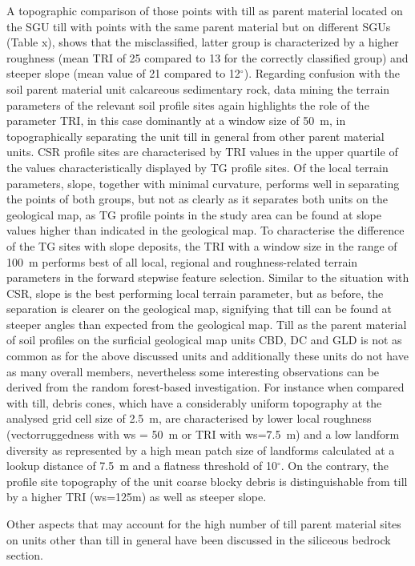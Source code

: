 \documentclass[preprint,12pt,authoryear]{elsarticle}
\begin{document}
 A topographic comparison of those points with till as parent material located on the SGU till with points with the same parent material but on different SGUs (Table x), shows that the misclassified, latter group is characterized by a higher roughness (mean TRI of 25 compared to 13 for the correctly classified group) and steeper slope (mean value of 21 compared to 12$^{\circ}$). Regarding confusion with the soil parent material unit calcareous sedimentary rock, data mining the terrain parameters of the relevant soil profile sites again highlights the role of the parameter TRI, in this case dominantly at a window size of 50~m, in topographically separating the unit till in general from other parent material units. CSR profile sites are characterised by TRI values in the upper quartile of the values characteristically displayed by TG profile sites. Of the local terrain parameters, slope, together with minimal curvature, performs well in separating the points of both groups, but not as clearly as it separates both units on the geological map, as TG profile points in the study area can be found at slope values higher than indicated in the geological map. To characterise the difference of the TG sites with slope deposits, the TRI with a window size in the range of 100~m performs best of all local, regional and roughness-related terrain parameters in the forward stepwise feature selection. Similar to the situation with CSR, slope is the best performing local terrain parameter, but as before, the separation is clearer on the geological map, signifying that till can be found at steeper angles than   expected from the geological map. Till as the parent material of soil profiles on the surficial geological map units CBD, DC and GLD is not as common as for the above discussed units and additionally these units do not have as many overall members, nevertheless some interesting observations can be derived from the random forest-based investigation. For instance when compared with till, debris cones, which have a considerably uniform topography at the analysed grid cell size of 2.5~m, are characterised by lower local roughness (vectorruggedness with ws = 50~m or TRI with ws=7.5~m) and a low landform diversity as represented by a high mean patch size of landforms calculated at a lookup distance of 7.5~m and a flatness threshold of 10$^{\circ}$. On the contrary, the profile site topography of the unit coarse blocky debris is distinguishable from till by a higher TRI (ws=125m) as well as steeper slope.

Other aspects that may account for the high number of till parent material sites on units other than till in general have been discussed in the siliceous bedrock section.
\end{document}
